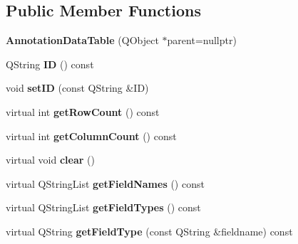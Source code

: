 \subsection*{Public Member Functions}
\begin{DoxyCompactItemize}
\item 
\mbox{\label{class_annotation_data_table_a9cd8dbd5517223faf88738861592e1b2}} 
{\bfseries Annotation\+Data\+Table} (Q\+Object $\ast$parent=nullptr)
\item 
\mbox{\label{class_annotation_data_table_a3bb5fef5eb61006cc1def988971dd1a7}} 
Q\+String {\bfseries ID} () const
\item 
\mbox{\label{class_annotation_data_table_a0c3caeb053de8a836591e2fb1d44276e}} 
void {\bfseries set\+ID} (const Q\+String \&ID)
\item 
\mbox{\label{class_annotation_data_table_aa83585d8e9a0f46217cef54e6edf34c8}} 
virtual int {\bfseries get\+Row\+Count} () const
\item 
\mbox{\label{class_annotation_data_table_ae615477727944e802d7c6a31a5b20fa3}} 
virtual int {\bfseries get\+Column\+Count} () const
\item 
\mbox{\label{class_annotation_data_table_affff74ce59813fc25d3bacdfd7fca8a7}} 
virtual void {\bfseries clear} ()
\item 
\mbox{\label{class_annotation_data_table_a83c2f39fe283c1a24143aa6081782c82}} 
virtual Q\+String\+List {\bfseries get\+Field\+Names} () const
\item 
\mbox{\label{class_annotation_data_table_ab5034b1e2e4ac003256e16c23f3c8ef4}} 
virtual Q\+String\+List {\bfseries get\+Field\+Types} () const
\item 
\mbox{\label{class_annotation_data_table_a61bfa44a0812926cfd0dfd8fcbf212aa}} 
virtual Q\+String {\bfseries get\+Field\+Type} (const Q\+String \&fieldname) const
\item 

\end{DoxyCompactItemize}
